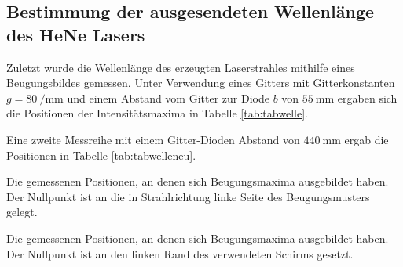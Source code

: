 \subsection{Bestimmung der ausgesendeten Wellenlänge des HeNe Lasers}
Zuletzt wurde die Wellenlänge des erzeugten Laserstrahles mithilfe eines Beugungsbildes gemessen. Unter Verwendung eines Gitters mit Gitterkonstanten $g = \SI{80}{\per\milli\meter}$ und einem Abstand vom Gitter zur Diode $b$ von $\SI{55}{\milli\meter}$ ergaben sich die Positionen der Intensitätsmaxima in Tabelle \ref{tab:tabwelle}.


Eine zweite Messreihe mit einem Gitter-Dioden Abstand von $\SI{440}{\milli\meter}$ ergab die Positionen in Tabelle \ref{tab:tabwelleneu}.





	
\begin{table}
	\centering
	\caption{Die gemessenen Positionen, an denen sich Beugungsmaxima ausgebildet haben. Der Nullpunkt ist an die in Strahlrichtung linke Seite des Beugungsmusters gelegt.}
	
	\label{tab:tabwelle}
\end{table}
\begin{table}
	\centering
	\caption{Die gemessenen Positionen, an denen sich Beugungsmaxima ausgebildet haben. Der Nullpunkt ist an den linken Rand des verwendeten Schirms gesetzt.}
	
	\label{tab:tabwelleneu}
\end{table}